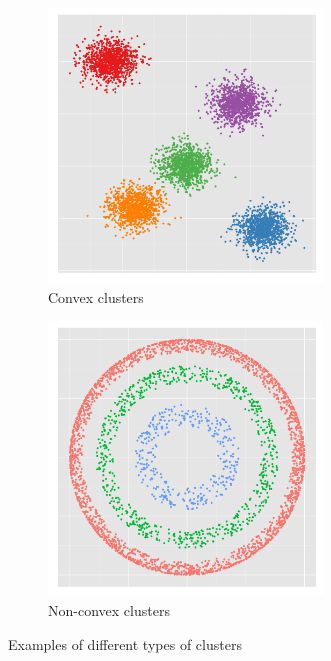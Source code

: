 \begin{figure}[h!]
  \centering

  \begin{subfigure}{0.4\textwidth}
    \centering
    \includegraphics[width = 0.8\textwidth]{my_compact}
    \caption{Convex clusters}
  \label{fig:compact}
  \end{subfigure}
  \begin{subfigure}{0.4\textwidth}
    \centering
    \includegraphics[width = 0.8\textwidth]{my_connected}
     \caption{Non-convex clusters}
     \label{fig:connected}
     \end{subfigure}
  \caption{Examples of different types of clusters}
  \label{fig:compact_connected}
\end{figure}

